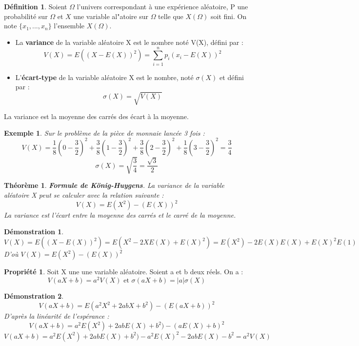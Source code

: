 \documentclass[a4paper,12pt,final]{article}
\newtheorem{Ex}{Exemple}[section]
\newtheorem{Proof}{Démonstration}[section]
\theoremstyle{theorem}
\newtheorem{Th}{Théorème}[section]
\theoremstyle{definition}
\newtheorem{Propriete}{Propriété}[section]
\theoremstyle{definition}
\theoremstyle{definition}
\newtheorem{Def}{Définition}[section]
\begin{document}
	\begin{Def}
		Soient $\Omega$ l'univers correspondant à une expérience aléatoire, P une probabilité sur $\Omega$ et $X$ une variable al"atoire sur $\Omega$ telle que $X(\Omega)$ soit fini. On note $\{x_{1},...,x_{n}\}$ l'ensemble $X(\Omega)$. \\
		\begin{itemize}
			\item La \textbf{variance} de la variable aléatoire X est le nombre noté V(X), défini par :
			\[V(X) = E((X - E(X))^{2}) = \sum_{i=1}^{n} p_{i}(x_{i} - E(X))^{2}\]
			\item L'\textbf{écart-type} de la variable aléatoire X est le nombre, noté $\sigma (X)$ et défini par : 
			\[\sigma (X) = \sqrt{V(X)}\]
		\end{itemize}
	
		La variance est la moyenne des carrés des écart à la moyenne.
	\end{Def}

	\begin{Ex}
		Sur le problème de la pièce de monnaie lancée 3 fois :
		\[V(X) = \frac{1}{8}(0-\frac{3}{2})^{2} + \frac{3}{8}(1-\frac{3}{2})^{2} + \frac{3}{8}(2-\frac{3}{2})^{2} + \frac{1}{8}(3-\frac{3}{2})^{2} = \frac{3}{4}\]
		\[\sigma (X) = \sqrt{\frac{3}{4}} = \frac{\sqrt{3}}{2}\]
	\end{Ex}

	\begin{Th}
		\textbf{Formule de König-Huygens}. La variance de la variable aléatoire X peut se calculer avec la relation suivante : 
		\[V(X) = E(X^{2}) - (E(X))^{2}\]
		La variance est l'écart entre la moyenne des carrés et le carré de la moyenne.
	\end{Th}

	\begin{Proof}
		\[V(X) = E((X-E(X))^{2}) = E(X^{2} - 2XE(X) + E(X)^{2}) = E(X^{2}) - 2E(X)E(X) + E(X)^{2}E(1)\]
		D'où $V(X) = E(X^{2}) - (E(X))^{2}$
	\end{Proof}	

	\begin{Propriete}
		Soit X une une variable aléatoire. Soient a et b deux réels. On a :
		\[V(aX + b) = a^{2}V(X) \text{ et } \sigma(aX + b) = \lvert a \rvert \sigma(X)\]
	\end{Propriete}

	\begin{Proof}
		\[V(aX + b) = E(a^{2}X^{2} + 2abX + b^{2}) - (E(aX+b))^{2}\]
		D'après la linéarité de l'espérance : 
		\[V(aX+b) = a^{2}E(X^{2}) + 2abE(X) + b^{2}) - (aE(X) + b)^{2}\] \[V(aX+b) = a^{2}E(X^{2}) + 2abE(X) + b^{2}) - a^{2}E(X)^{2} - 2abE(X) -b^{2} = a^{2}V(X) \]
	\end{Proof}
\end{document}
